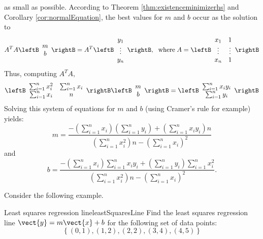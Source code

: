 as small as possible. According to Theorem \ref{thm:existenceminimizerhs} and
Corollary \ref{cor:normalEquation}, the best values for $m$ and $b$ occur as the
solution to 
\begin{equation*}
A^{T}A\leftB 
\begin{array}{c}
m \\ 
b
\end{array}
\rightB =A^{T}\leftB 
\begin{array}{c}
y_{1} \\ 
\vdots \\ 
y_{n}
\end{array}
\rightB ,\ \;\mbox{where}\; A=\leftB
\begin{array}{cc}
x_{1} & 1 \\ 
\vdots & \vdots \\ 
x_{n} & 1
\end{array}
\rightB 
\end{equation*}
Thus, computing $A^{T}A,$ 
\begin{equation*}
\leftB 
\begin{array}{cc}
\sum_{i=1}^{n}x_{i}^{2} & \sum_{i=1}^{n}x_{i} \\ 
\sum_{i=1}^{n}x_{i} & n
\end{array}
\rightB \leftB 
\begin{array}{c}
m \\ 
b
\end{array}
\rightB =\leftB 
\begin{array}{c}
\sum_{i=1}^{n}x_{i}y_{i} \\ 
\sum_{i=1}^{n}y_{i}
\end{array}
\rightB
\end{equation*}
Solving this system of equations for $m$ and $b$ (using Cramer's rule for example) yields: 
\begin{equation*}
m=
\frac{-\left( \sum_{i=1}^{n}x_{i}\right) \left( \sum_{i=1}^{n}y_{i}\right)
+\left( \sum_{i=1}^{n}x_{i}y_{i}\right) n}{\left(
\sum_{i=1}^{n}x_{i}^{2}\right) n-\left( \sum_{i=1}^{n}x_{i}\right) ^{2}}
\end{equation*}
and 
\begin{equation*}
b=\frac{-\left( \sum_{i=1}^{n}x_{i}\right) \sum_{i=1}^{n}x_{i}y_{i}+\left(
\sum_{i=1}^{n}y_{i}\right) \sum_{i=1}^{n}x_{i}^{2}}{\left(
\sum_{i=1}^{n}x_{i}^{2}\right) n-\left( \sum_{i=1}^{n}x_{i}\right) ^{2}}.
\end{equation*}

Consider the following example.

\begin{example}{Least squares regression line}{leastSquaresLine}
Find the least squares regression line $\vect{y}=m\vect{x}+b$ for the following set of data points:
\[ \left\{ (0,1), (1,2), (2,2), (3,4), (4,5) \right\} \]
\end{example}

